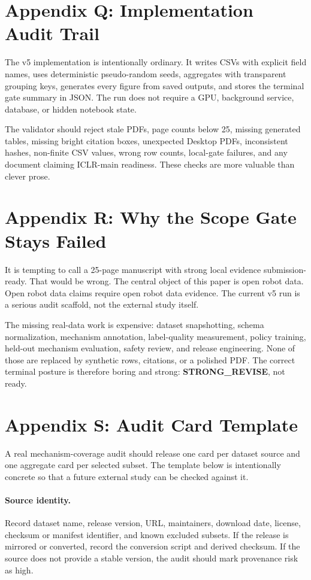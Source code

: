 \documentclass{article}
\begin{document}
\section{Appendix Q: Implementation Audit Trail}
The v5 implementation is intentionally ordinary. It writes CSVs with explicit field names, uses deterministic pseudo-random seeds, aggregates with transparent grouping keys, generates every figure from saved outputs, and stores the terminal gate summary in JSON. The run does not require a GPU, background service, database, or hidden notebook state.

The validator should reject stale PDFs, page counts below 25, missing generated tables, missing bright citation boxes, unexpected Desktop PDFs, inconsistent hashes, non-finite CSV values, wrong row counts, local-gate failures, and any document claiming ICLR-main readiness. These checks are more valuable than clever prose.

\section{Appendix R: Why the Scope Gate Stays Failed}
It is tempting to call a 25-page manuscript with strong local evidence submission-ready. That would be wrong. The central object of this paper is open robot data. Open robot data claims require open robot data evidence. The current v5 run is a serious audit scaffold, not the external study itself.

The missing real-data work is expensive: dataset snapshotting, schema normalization, mechanism annotation, label-quality measurement, policy training, held-out mechanism evaluation, safety review, and release engineering. None of those are replaced by synthetic rows, citations, or a polished PDF. The correct terminal posture is therefore boring and strong: \textbf{STRONG\_REVISE}, not ready.

\section{Appendix S: Audit Card Template}
A real mechanism-coverage audit should release one card per dataset source and one aggregate card per selected subset. The template below is intentionally concrete so that a future external study can be checked against it.

\paragraph{Source identity.}
Record dataset name, release version, URL, maintainers, download date, license, checksum or manifest identifier, and known excluded subsets. If the release is mirrored or converted, record the conversion script and derived checksum. If the source does not provide a stable version, the audit should mark provenance risk as high.
\end{document}
